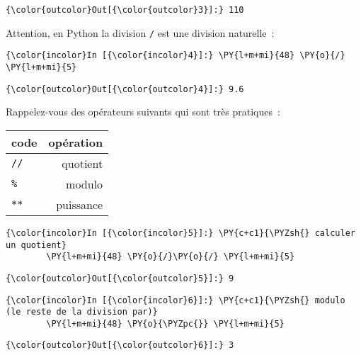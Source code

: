 \begin{Verbatim}[commandchars=\\\{\}]
{\color{outcolor}Out[{\color{outcolor}3}]:} 110
\end{Verbatim}
            
    Attention, en Python la division \texttt{/} est une division naturelle~:

    \begin{Verbatim}[commandchars=\\\{\}]
{\color{incolor}In [{\color{incolor}4}]:} \PY{l+m+mi}{48} \PY{o}{/} \PY{l+m+mi}{5}
\end{Verbatim}


\begin{Verbatim}[commandchars=\\\{\}]
{\color{outcolor}Out[{\color{outcolor}4}]:} 9.6
\end{Verbatim}
            
    Rappelez-vous des opérateurs suivants qui sont très pratiques~:

\begin{longtable}[]{@{}lr@{}}
\toprule
code & opération\tabularnewline
\midrule
\endhead
\texttt{//} & quotient\tabularnewline
\texttt{\%} & modulo\tabularnewline
\texttt{**} & puissance\tabularnewline
\bottomrule
\end{longtable}

    \begin{Verbatim}[commandchars=\\\{\}]
{\color{incolor}In [{\color{incolor}5}]:} \PY{c+c1}{\PYZsh{} calculer un quotient}
        \PY{l+m+mi}{48} \PY{o}{/}\PY{o}{/} \PY{l+m+mi}{5}
\end{Verbatim}


\begin{Verbatim}[commandchars=\\\{\}]
{\color{outcolor}Out[{\color{outcolor}5}]:} 9
\end{Verbatim}
            
    \begin{Verbatim}[commandchars=\\\{\}]
{\color{incolor}In [{\color{incolor}6}]:} \PY{c+c1}{\PYZsh{} modulo (le reste de la division par)}
        \PY{l+m+mi}{48} \PY{o}{\PYZpc{}} \PY{l+m+mi}{5}
\end{Verbatim}


\begin{Verbatim}[commandchars=\\\{\}]
{\color{outcolor}Out[{\color{outcolor}6}]:} 3
\end{Verbatim}
            
